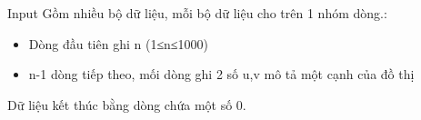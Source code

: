 Input
Gồm nhiều bộ dữ liệu, mỗi bộ dữ liệu cho trên 1 nhóm dòng.:  
\begin{itemize}
	\item     Dòng đầu tiên ghi n (1≤n≤1000)   
	\item     n-1 dòng tiếp theo, mối dòng ghi 2 số u,v mô tả một cạnh của đồ thị   
\end{itemize}

   Dữ liệu kết thúc bằng dòng chứa một số 0.